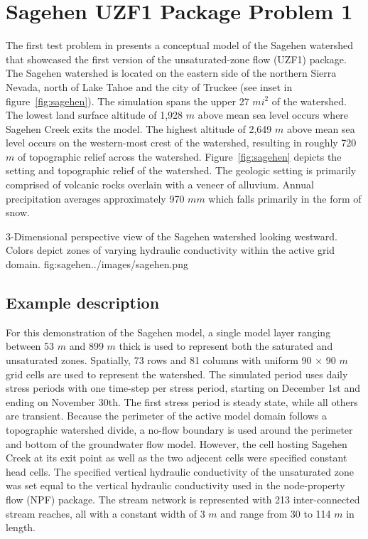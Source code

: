 \section{Sagehen UZF1 Package Problem 1}

The first test problem in \cite{UZF} presents a conceptual model of the Sagehen watershed that showcased the first version of the unsaturated-zone flow (UZF1) package. The Sagehen watershed is located on the eastern side of the northern Sierra Nevada, north of Lake Tahoe and the city of Truckee (see inset in figure~\ref{fig:sagehen}). The simulation spans the upper 27 $mi^2$ of the watershed.  The lowest land surface altitude of 1,928 $m$ above mean sea level occurs where Sagehen Creek exits the model.  The highest altitude of 2,649 $m$ above mean sea level occurs on the western-most crest of the watershed, resulting in roughly 720 $m$ of topographic relief across the watershed.  Figure~\ref{fig:sagehen} depicts the setting and topographic relief of the watershed. The geologic setting is primarily comprised of volcanic rocks overlain with a veneer of alluvium. Annual precipitation averages approximately 970 $mm$ which falls primarily in the form of snow.  

\begin{StandardFigure}
	{3-Dimensional perspective view of the Sagehen watershed looking westward.  Colors depict zones of varying hydraulic conductivity within the active grid domain.}
	{fig:sagehen}{../images/sagehen.png}
\end{StandardFigure}

\subsection{Example description}

For this \mf demonstration of the Sagehen model, a single model layer ranging between 53 $m$ and 899 $m$ thick is used to represent both the saturated and unsaturated zones.  Spatially, 73 rows and 81 columns with uniform 90 $\times$ 90 $m$ grid cells are used to represent the watershed.  The simulated period uses daily stress periods with one time-step per stress period, starting on December 1st and ending on November 30th.  The first stress period is steady state, while all others are transient.  Because the perimeter of the active model domain follows a topographic watershed divide, a no-flow boundary is used around the perimeter and bottom of the groundwater flow model.  However, the cell hosting Sagehen Creek at its exit point as well as the two adjecent cells were specified constant head cells.  The specified vertical hydraulic conductivity of the unsaturated zone was set equal to the vertical hydraulic conductivity used in the node-property flow (NPF) package. The stream network is represented with 213 inter-connected stream reaches, all with a constant width of 3 $m$ and range from 30 to 114 $m$ in length.  

